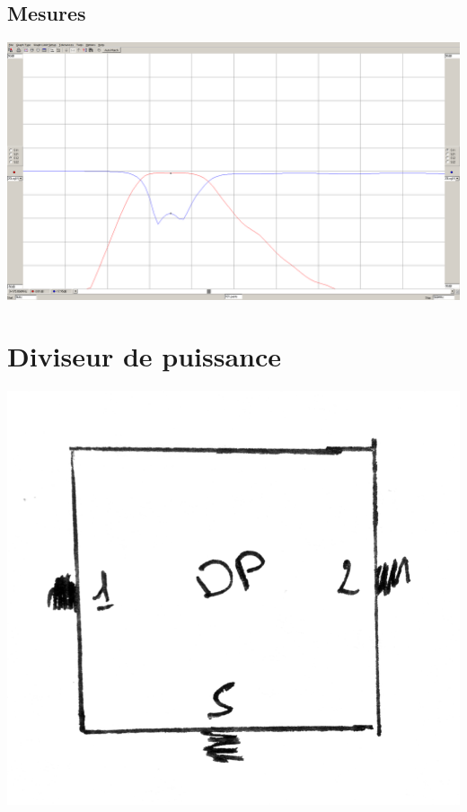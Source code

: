 \documentclass[a4paper,12pt]{report}            %
\begin{document}
\section{Mesures}

\begin{center}\includegraphics[scale = 0.25]{pic/parametre_passe_bande.png}\\ \end{center}

\chapter{Diviseur de puissance}

\begin{center}\includegraphics[scale = 0.2]{pic/DP.png}\\ \end{center}
\end{document}
